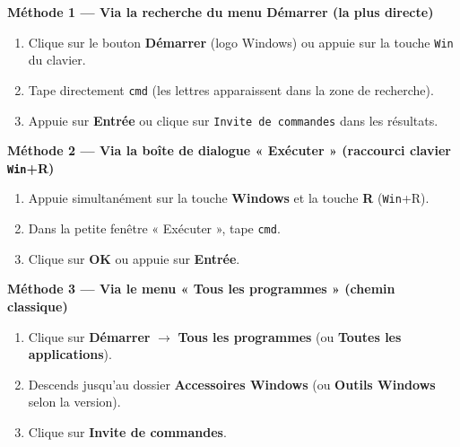 \documentclass[11pt]{article}
\begin{document}
\begin{methode}
\textbf{Méthode 1 — Via la recherche du menu Démarrer (la plus directe)}\par
\begin{enumerate}
    \item Clique sur le bouton \textbf{Démarrer} (logo Windows) ou appuie sur la touche \texttt{Win} du clavier.
    \item Tape directement \texttt{cmd} (les lettres apparaissent dans la zone de recherche).
    \item Appuie sur \textbf{Entrée} ou clique sur \texttt{Invite de commandes} dans les résultats.
\end{enumerate}

\textbf{Méthode 2 — Via la boîte de dialogue « Exécuter » (raccourci clavier \texttt{Win}+R)}\par
\begin{enumerate}
    \item Appuie simultanément sur la touche \textbf{Windows} et la touche \textbf{R} (\texttt{Win}+R).
    \item Dans la petite fenêtre « Exécuter », tape \texttt{cmd}.
    \item Clique sur \textbf{OK} ou appuie sur \textbf{Entrée}.
\end{enumerate}

\textbf{Méthode 3 — Via le menu « Tous les programmes » (chemin classique)}\par
\begin{enumerate}
    \item Clique sur \textbf{Démarrer} $\rightarrow$ \textbf{Tous les programmes} (ou \textbf{Toutes les applications}).
    \item Descends jusqu'au dossier \textbf{Accessoires Windows} (ou \textbf{Outils Windows} selon la version).
    \item Clique sur \textbf{Invite de commandes}.
\end{enumerate}
\end{methode}
\end{document}
